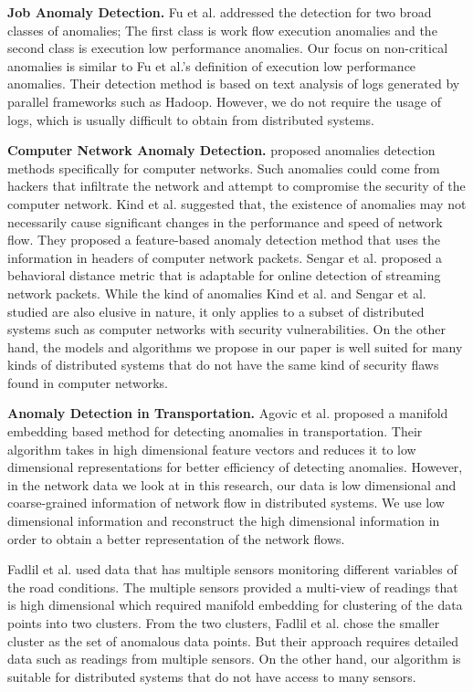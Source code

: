 \documentclass[conference]{IEEEtran.1.8}
\begin{document}
\textbf{Job Anomaly Detection.} Fu et al. \cite{Fu2009} addressed the detection for two broad classes of anomalies; The first class is work flow execution anomalies and the second class is execution low performance anomalies. Our focus on non-critical anomalies is similar to Fu et al.'s definition of execution low performance anomalies. Their detection method is based on text analysis of logs generated by parallel frameworks such as Hadoop. However, we do not require the usage of logs, which is usually difficult to obtain from distributed systems.

\textbf{Computer Network Anomaly Detection.} \cite{Kind2009, Sengar2009} proposed anomalies detection methods specifically for computer networks. Such anomalies could come from hackers that infiltrate the network and attempt to compromise the security of the computer network. Kind et al. \cite{Kind2009} suggested that, the existence of anomalies may not necessarily cause significant changes in the performance and speed of network flow. They proposed a feature-based anomaly detection method that uses the information in headers of computer network packets. Sengar et al. \cite{Sengar2009} proposed a behavioral distance metric that is adaptable for online detection of streaming network packets. While the kind of anomalies Kind et al. \cite{Kind2009} and Sengar et al. \cite{Sengar2009} studied are also elusive in nature, it only applies to a subset of distributed systems such as computer networks with security vulnerabilities. On the other hand, the models and algorithms we propose in our paper is well suited for many kinds of distributed systems that do not have the same kind of security flaws found in computer networks.

\textbf{Anomaly Detection in Transportation.} Agovic et al. \cite{Agovic2009} proposed a manifold embedding based method for detecting anomalies in transportation. Their algorithm takes in high dimensional feature vectors and reduces it to low dimensional representations for better efficiency of detecting anomalies. However, in the network data we look at in this research, our data is low dimensional and coarse-grained information of network flow in distributed systems. We use low dimensional information and reconstruct the high dimensional information in order to obtain a better representation of the network flows.

Fadlil et al. \cite{Fadlil2013} used data that has multiple sensors monitoring different variables of the road conditions. The multiple sensors provided a multi-view of readings that is high dimensional which required manifold embedding \cite{Agovic2009} for clustering of the data points into two clusters. From the two clusters, Fadlil et al. chose the smaller cluster as the set of anomalous data points. But their approach requires detailed data such as readings from multiple sensors. On the other hand, our algorithm is suitable for distributed systems that do not have access to many sensors.
\end{document}

